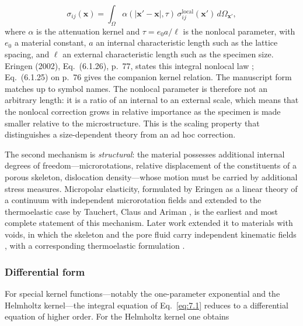 \begin{equation}
\sigma_{ij}(\bm{x}) = \int_\Omega \alpha(|\bm{x}' - \bm{x}|, \tau)\, \sigma_{ij}^{\mathrm{local}}(\bm{x}')\, d\Omega_{\bm{x}'},
\label{eq:7.1}
\end{equation}
where $\alpha$ is the attenuation kernel and $\tau = e_0 a/\ell$ is the nonlocal parameter, with $e_0$ a material constant, $a$ an internal characteristic length such as the lattice spacing, and $\ell$ an external characteristic length such as the specimen size. Eringen (2002), Eq.~(6.1.26), p.~77, states this integral nonlocal law \cite{Eringen2002}; Eq.~(6.1.25) on p.~76 gives the companion kernel relation. The manuscript form matches up to symbol names. The nonlocal parameter is therefore not an arbitrary length: it is a ratio of an internal to an external scale, which means that the nonlocal correction grows in relative importance as the specimen is made smaller relative to the microstructure. This is the scaling property that distinguishes a size-dependent theory from an ad hoc correction.

The second mechanism is \emph{structural}: the material possesses additional internal degrees of freedom---microrotations, relative displacement of the constituents of a porous skeleton, dislocation density---whose motion must be carried by additional stress measures. Micropolar elasticity, formulated by Eringen as a linear theory of a continuum with independent microrotation fields \cite{Eringen1966a} and extended to the thermoelastic case by Tauchert, Claus and Ariman \cite{TauchertClausAriman1968}, is the earliest and most complete statement of this mechanism. Later work extended it to materials with voids, in which the skeleton and the pore fluid carry independent kinematic fields \cite{Nunziato1979,Cowin1983}, with a corresponding thermoelastic formulation \cite{Iesan1986}.

\subsubsection{Differential form}

For special kernel functions---notably the one-parameter exponential and the Helmholtz kernel---the integral equation of Eq.~\eqref{eq:7.1} reduces to a differential equation of higher order. For the Helmholtz kernel one obtains

